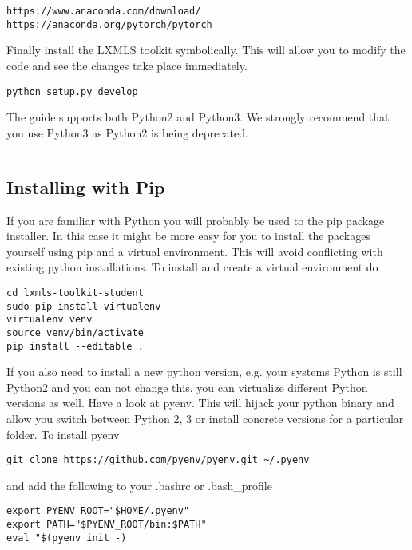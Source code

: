 \begin{verbatim}
https://www.anaconda.com/download/
https://anaconda.org/pytorch/pytorch
\end{verbatim}

Finally install the LXMLS toolkit symbolically. This will allow you to modify the code and see the changes take place immediately.

\begin{verbatim}
python setup.py develop
\end{verbatim}

\noindent The guide supports both Python2 and Python3. We strongly recommend that you use Python3 as Python2 is being deprecated. 

\begin{verbatim}
\end{verbatim}

\subsection{Installing with Pip}

If you are familiar with Python you will probably be used to the pip package installer. In this case it might be more easy for you to install the packages yourself using pip and a virtual environment. This will avoid conflicting with existing python installations. To install and create a virtual environment do

\begin{verbatim}
cd lxmls-toolkit-student
sudo pip install virtualenv
virtualenv venv 
source venv/bin/activate
pip install --editable .
\end{verbatim}

If you also need to install a new python version, e.g. your systems Python is still Python2 and you can not change this, you can virtualize different Python versions as well. Have a look at pyenv. This will hijack your python binary and allow you
switch between Python 2, 3 or install concrete versions for a particular folder. To install pyenv

\begin{verbatim}
git clone https://github.com/pyenv/pyenv.git ~/.pyenv
\end{verbatim}

\noindent and add the following to your .bashrc or .bash\_profile

\begin{verbatim}
export PYENV_ROOT="$HOME/.pyenv"
export PATH="$PYENV_ROOT/bin:$PATH"
eval "$(pyenv init -)
\end{verbatim}

